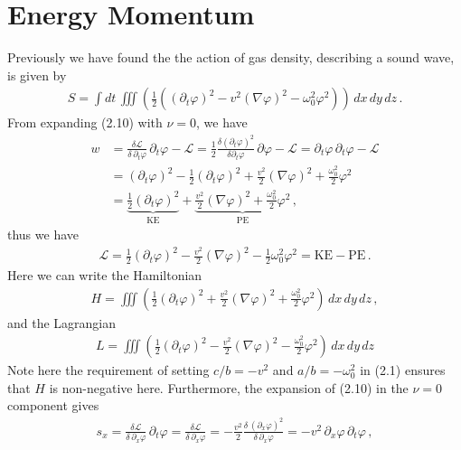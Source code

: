 \documentclass[11pt, onesided]{book}
\theoremstyle{break}
\theoremstyle{break}
\newcommand{\pd}{\partial}
\begin{document}
\section[Energy Momentum]{\color{red} Energy Momentum\color{black}}
Previously we have found the the action of gas density, describing a sound wave, is given by
\begin{align*}
S = \int dt\, \iiint  \left( \frac{1}{2}\left( (\pd_t \varphi)^2 - v^2(\nabla \varphi)^2 - \omega_0^2 \varphi^2 \right) \right) \, dx\,dy\,dz\,.
\end{align*}
From expanding (2.10) with $\nu = 0$, we have
\begin{align*}
w &= \frac{\delta \mathcal{L}}{\delta\, \pd_t \varphi} \,\pd_t \varphi - \mathcal{L} = \frac{1}{2} \frac{\delta (\pd_t \varphi)^2}{\delta \pd_t \varphi} \, \pd\varphi - \mathcal{L} = \pd_t \varphi \, \pd_t \varphi - \mathcal{L}\\
&= (\pd_t\varphi)^2 - \frac{1}{2}(\pd_t \varphi)^2 + \frac{v^2}{2}(\nabla \varphi)^2 + \frac{\omega_0^2}{2} \varphi^2 \\
&=\underbrace{ \frac{1}{2}(\pd_t \varphi)^2}_{\text{KE}} + \underbrace{\frac{v^2}{2} (\nabla \varphi)^2 + \frac{\omega_0^2}{2} \varphi^2}_{\text{PE}}\,,
\end{align*}
thus we have
\begin{align*}
\mathcal{L} = \frac{1}{2}(\pd_t \varphi)^2 - \frac{v^2}{2}(\nabla \varphi)^2 - \frac{1}{2}\omega_0^2 \varphi^2 = \text{KE} - \text{PE}\,.
\end{align*}
Here we can write the Hamiltonian
\begin{align}
H = \iiint \left( \frac{1}{2}(\pd_t \varphi)^2 +\frac{v^2}{2} (\nabla \varphi)^2 + \frac{\omega_0^2}{2} \varphi^2  \right) \, dx\, dy\, dz\,,
\end{align}
and the Lagrangian
\begin{align}
L = \iiint\left( \frac{1}{2}(\pd_t \varphi)^2 -\frac{v^2}{2} (\nabla \varphi)^2 - \frac{\omega_0^2}{2} \varphi^2  \right)\,dx\, dy\,dz
\end{align}
Note here the requirement of setting $c/b=-v^2$ and $a/b = -\omega_0^2$ in (2.1) ensures that $H$ is non-negative here. Furthermore, the expansion of (2.10) in the $\nu = 0$ component gives
\begin{align*}
s_x = \frac{\delta \mathcal{L}}{\delta \, \pd_x \varphi} \, \pd_t \varphi = \frac{\delta \mathcal{L}}{\delta\, \pd_x \varphi} = -\frac{v^2}{2}\frac{\delta\,(\pd_x \varphi)^2}{\delta \, \pd_x \varphi} = -v^2\, \pd_x \varphi\, \pd_t \varphi\,,
\end{align*}
\end{document}
